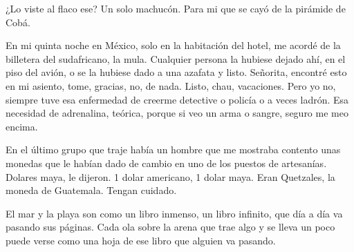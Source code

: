 \documentclass[12pt,twoside,openright,a5paper]{book}
\begin{document}
\vspace{0.5cm}
\hrulefill\hspace{0.2cm} \decofourleft\decofourright \hspace{0.2cm} \hrulefill
\vspace{0.5cm}

¿Lo viste al flaco ese? Un solo machucón. Para mi que se cayó de la
pirámide de Cobá.


\afterpage{}
\vspace{0.5cm}
\hrulefill\hspace{0.2cm} \decofourleft\decofourright \hspace{0.2cm} \hrulefill
\vspace{0.5cm}

En mi quinta noche en México, solo en la habitación del hotel, me acordé
de la billetera del sudafricano, la mula. Cualquier persona la hubiese
dejado ahí, en el piso del avión, o se la hubiese dado a una azafata
y listo. Señorita, encontré esto en mi asiento, tome, gracias, no, de
nada. Listo, chau, vacaciones. Pero yo no, siempre tuve esa enfermedad de
creerme detective o policía o a veces ladrón. Esa necesidad de adrenalina,
teórica, porque si veo un arma o sangre, seguro me meo encima.


\vspace{0.5cm}
\hrulefill\hspace{0.2cm} \decofourleft\decofourright \hspace{0.2cm} \hrulefill
\vspace{0.5cm}

En el último grupo que traje había un hombre que me mostraba contento
unas monedas que le habían dado de cambio en uno de los puestos de
artesanías. Dolares maya, le dijeron. 1 dolar americano, 1 dolar maya. Eran
Quetzales, la moneda de Guatemala. Tengan cuidado.


\vspace{0.5cm}
\hrulefill\hspace{0.2cm} \decofourleft\decofourright \hspace{0.2cm} \hrulefill
\vspace{0.5cm}

El mar y la playa son como un libro inmenso, un libro infinito, que día
a día va pasando sus páginas. Cada ola sobre la arena que trae algo y se
lleva un poco puede verse como una hoja de ese libro que alguien va pasando.
\end{document}
